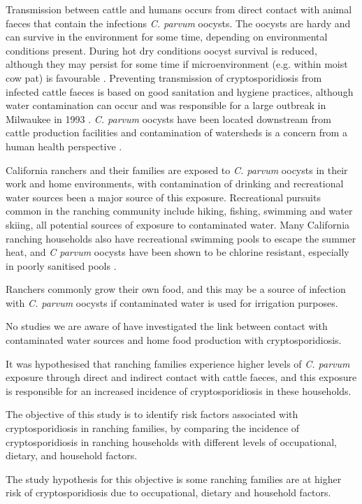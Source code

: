 \documentclass[12pt]{article}
\begin{document}
	
	Transmission between cattle and humans occurs from direct contact with animal faeces that contain the infections \emph{C. parvum} oocysts\cite{malmo2010}.
	The oocysts are hardy and can survive in the environment for some time, depending on environmental conditions present. 
	During hot dry conditions oocyst survival is reduced, although they may persist for some time if microenvironment (e.g. within moist cow pat) is favourable \cite{Robertson1992}.
	Preventing transmission of cryptosporidiosis from infected cattle faeces is based on good sanitation and hygiene practices\cite{malmo2010}, although water contamination can occur and was responsible for a large outbreak in Milwaukee in 1993 \cite{Kenzie1994}. 
	\emph{C. parvum} oocysts have been located downstream from cattle production facilities and contamination of watersheds is a concern from a human health perspective \cite{Ong1996}. 


	California ranchers and their families are exposed to \emph{C. parvum} oocysts in their work and home environments, with contamination of drinking and recreational water sources been a major source of this exposure.
	Recreational pursuits common in the ranching community include hiking, fishing, swimming and water skiing, all potential sources of exposure to contaminated water. 
	Many California ranching households also have recreational swimming pools to escape the summer heat, and \emph{C parvum} oocysts have been shown to be chlorine resistant, especially in poorly sanitised pools \cite{Carpenter1999}.


	Ranchers commonly grow their own food, and this may be a source of infection with \emph{C. parvum} oocysts if contaminated water is used for irrigation purposes.


	No studies we are aware of have investigated the link between contact with contaminated water sources and home food production with cryptosporidiosis. 


	It was hypothesised that ranching families experience higher levels of \emph{C. parvum} exposure through direct and indirect contact with cattle faeces, and this exposure is responsible for an increased incidence of cryptosporidiosis in these households.

		
	The objective of this study is to identify risk factors associated with cryptosporidiosis in ranching families, by comparing the incidence of cryptosporidiosis in ranching households with different levels of occupational, dietary, and household factors.


	The study hypothesis for this objective is some ranching families are at higher risk of cryptosporidiosis due to occupational, dietary and household factors.
\end{document}
